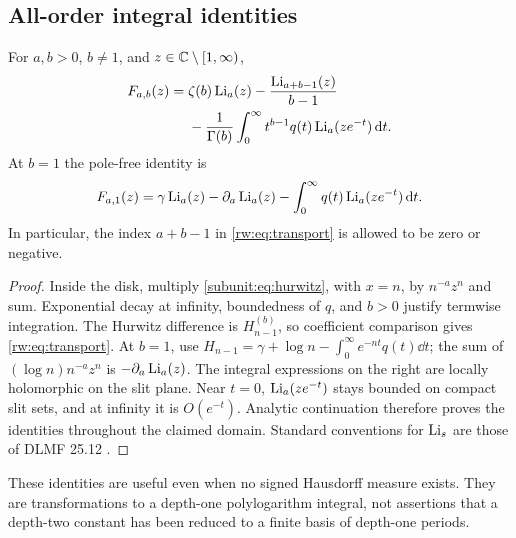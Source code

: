 \subsection{All-order integral identities}
\begin{theorem}\label{rw:thm:transport}
For $a,b>0$, $b\ne1$, and $z\in\mathbb C\setminus[1,\infty)$,
\begin{align}\label{rw:eq:transport}
 F_{a,b}(z)={}&\zeta(b)\operatorname{Li}_a(z)-\frac{\operatorname{Li}_{a+b-1}(z)}{b-1}\notag\\
 &-\frac1{\Gamma(b)}\int_0^\infty t^{b-1}q(t)\operatorname{Li}_a(ze^{-t})\,\mathrm d t.
\end{align}
At $b=1$ the pole-free identity is
\begin{equation}\label{rw:eq:transport1}
 F_{a,1}(z)=\gamma\operatorname{Li}_a(z)-\partial_a\operatorname{Li}_a(z)
       -\int_0^\infty q(t)\operatorname{Li}_a(ze^{-t})\,\mathrm d t.
\end{equation}
In particular, the index $a+b-1$ in \eqref{rw:eq:transport} is allowed
to be zero or negative.
\end{theorem}
\begin{proof}
Inside the disk, multiply \eqref{subunit:eq:hurwitz}, with $x=n$, by
$n^{-a}z^n$ and sum. Exponential decay at infinity, boundedness of
$q$, and $b>0$ justify termwise integration. The Hurwitz difference
is $H_{n-1}^{(b)}$, so coefficient comparison gives
\eqref{rw:eq:transport}. At $b=1$, use
$H_{n-1}=\gamma+\log n-\int_0^\infty e^{-nt}q(t)\dd t$;
the sum of $(\log n)n^{-a}z^n$ is $-\partial_a\operatorname{Li}_a(z)$.
The integral expressions on the right are locally holomorphic on the
slit plane. Near $t=0$, $\operatorname{Li}_a(ze^{-t})$ stays bounded on compact
slit sets, and at infinity it is $O(e^{-t})$. Analytic continuation
therefore proves the identities throughout the claimed domain.
Standard conventions for $\operatorname{Li}_s$ are those of DLMF 25.12
\cite{rw:DLMFPolylog}.
\end{proof}

These identities are useful even when no signed Hausdorff measure
exists. They are transformations to a depth-one polylogarithm integral,
not assertions that a depth-two constant has been reduced to a finite
basis of depth-one periods.
